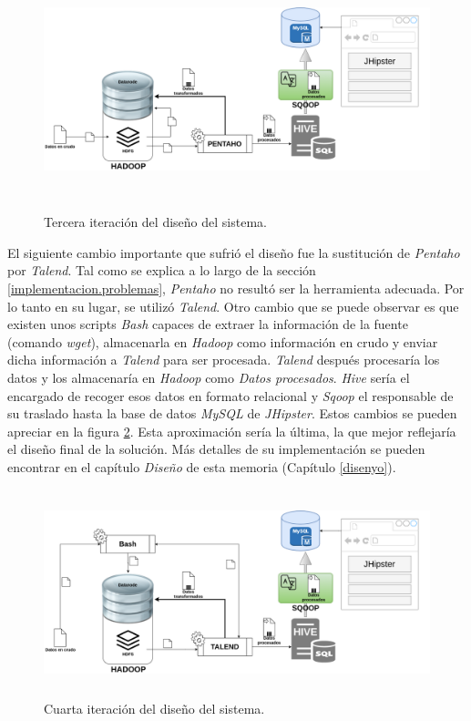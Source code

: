 \begin{figure}[H]
    \centering
    \includegraphics[width=1\textwidth,height=7cm]{Imagenes/Dis_Fig_3}
    \caption{Tercera iteración del diseño del sistema.}
    \label{fig:dis_3_sist}
\end{figure}
\par

El siguiente cambio importante que sufrió el diseño fue la sustitución de \textit{Pentaho} por \textit{Talend}. Tal como se explica a lo largo de la sección \ref{implementacion.problemas}, \textit{Pentaho} no resultó ser la herramienta adecuada. Por lo tanto en su lugar, se utilizó \textit{Talend}. Otro cambio que se puede observar es que existen unos scripts \textit{Bash} capaces de extraer la información de la fuente (comando \textit{wget}), almacenarla en \textit{Hadoop} como información en crudo y enviar dicha información a \textit{Talend} para ser procesada. 
\textit{Talend} después procesaría los datos y los almacenaría en \textit{Hadoop} como \textit{Datos procesados}. \textit{Hive} sería el encargado de recoger esos datos en formato relacional y \textit{Sqoop} el responsable de su traslado hasta la base de datos \textit{MySQL} de \textit{JHipster}. Estos cambios se pueden apreciar en la figura \ref{fig:dis_4_sist}. Esta aproximación sería la última, la que mejor reflejaría el diseño final de la solución. Más detalles de su implementación se pueden encontrar en el capítulo \textit{Diseño} de esta memoria (Capítulo \ref{disenyo}).

\begin{figure}[H]
    \centering
    \includegraphics[width=1\textwidth,height=6cm]{Imagenes/Dis_Fig_4}
    \caption{Cuarta iteración del diseño del sistema.}
    \label{fig:dis_4_sist}
\end{figure}